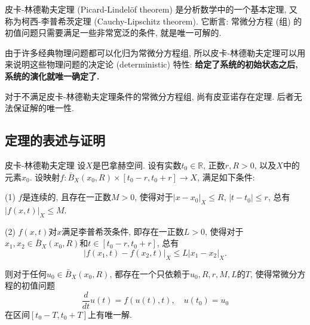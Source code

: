 
皮卡-林德勒夫定理 (Picard-Lindelöf theorem) 是分析数学中的一个基本定理, 又称为柯西-李普希茨定理 (Cauchy-Lipschitz theorem). 它断言: 常微分方程 (组) 的初值问题只需要满足一些非常宽泛的条件, 就是唯一可解的. 

由于许多经典物理问题都可以化归为常微分方程组, 所以皮卡-林德勒夫定理可以用来说明这些物理问题的决定论 (deterministic) 特性: \textbf{给定了系统的初始状态之后, 系统的演化就唯一确定了.}

对于不满足皮卡-林德勒夫定理条件的常微分方程组, 尚有皮亚诺存在定理. 后者无法保证解的唯一性.

\subsection{定理的表述与证明}
\begin{theorem}{皮卡-林德勒夫定理}
设$X$是巴拿赫空间. 设有实数$t_0\in\mathbb{R}$, 正数$r,R>0$, 以及$X$中的元素$x_0$. 设映射$f:\bar B_X(x_0,R)\times[t_0-r,t_0+r]\to X$, 满足如下条件:

(1) $f$是连续的, 且存在一正数$M>0$, 使得对于$|x-x_0|_X\leq R$, $|t-t_0|\leq r$, 总有$|f(x,t)|_X\leq M$.

(2) $f(x,t)$对$x$满足李普希茨条件, 即存在一正数$L>0$, 使得对于$x_1,x_2\in \bar B_X(x_0,R)$和$t\in[t_0-r,t_0+r]$, 总有$$
|f(x_1,t)-f(x_2,t)|_X\leq L|x_1-x_2|_X.
$$

则对于任何$u_0\in \bar B_X(x_0,R)$, 都存在一个只依赖于$u_0,R,r,M,L$的$T$, 使得常微分方程的初值问题
$$
\frac{d}{dt}u(t)=f(u(t),t),\quad u(t_0)=u_0
$$
在区间$[t_0-T,t_0+T]$上有唯一解.
\end{theorem}